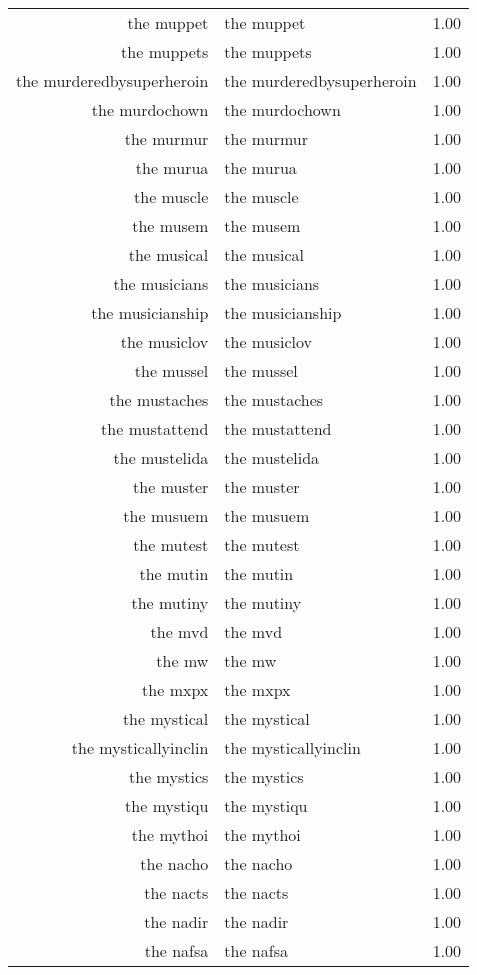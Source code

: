 \begin{table}[ht]
\begin{tabular}{rlr}
  the muppet & the muppet & 1.00 \\ 
  the muppets & the muppets & 1.00 \\ 
  the murderedbysuperheroin & the murderedbysuperheroin & 1.00 \\ 
  the murdochown & the murdochown & 1.00 \\ 
  the murmur & the murmur & 1.00 \\ 
  the murua & the murua & 1.00 \\ 
  the muscle & the muscle & 1.00 \\ 
  the musem & the musem & 1.00 \\ 
  the musical & the musical & 1.00 \\ 
  the musicians & the musicians & 1.00 \\ 
  the musicianship & the musicianship & 1.00 \\ 
  the musiclov & the musiclov & 1.00 \\ 
  the mussel & the mussel & 1.00 \\ 
  the mustaches & the mustaches & 1.00 \\ 
  the mustattend & the mustattend & 1.00 \\ 
  the mustelida & the mustelida & 1.00 \\ 
  the muster & the muster & 1.00 \\ 
  the musuem & the musuem & 1.00 \\ 
  the mutest & the mutest & 1.00 \\ 
  the mutin & the mutin & 1.00 \\ 
  the mutiny & the mutiny & 1.00 \\ 
  the mvd & the mvd & 1.00 \\ 
  the mw & the mw & 1.00 \\ 
  the mxpx & the mxpx & 1.00 \\ 
  the mystical & the mystical & 1.00 \\ 
  the mysticallyinclin & the mysticallyinclin & 1.00 \\ 
  the mystics & the mystics & 1.00 \\ 
  the mystiqu & the mystiqu & 1.00 \\ 
  the mythoi & the mythoi & 1.00 \\ 
  the nacho & the nacho & 1.00 \\ 
  the nacts & the nacts & 1.00 \\ 
  the nadir & the nadir & 1.00 \\ 
  the nafsa & the nafsa & 1.00 \\ 

\end{tabular}
\end{table}
